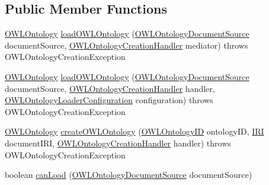\subsection*{Public Member Functions}
\begin{DoxyCompactItemize}
\item 
\hyperlink{interfaceorg_1_1semanticweb_1_1owlapi_1_1model_1_1_o_w_l_ontology}{O\-W\-L\-Ontology} \hyperlink{classuk_1_1ac_1_1manchester_1_1cs_1_1owl_1_1owlapi_1_1_empty_in_mem_o_w_l_ontology_factory_af634a79b6d9d3f0272448329b72fd5ac}{load\-O\-W\-L\-Ontology} (\hyperlink{interfaceorg_1_1semanticweb_1_1owlapi_1_1io_1_1_o_w_l_ontology_document_source}{O\-W\-L\-Ontology\-Document\-Source} document\-Source, \hyperlink{interfaceorg_1_1semanticweb_1_1owlapi_1_1model_1_1_o_w_l_ontology_factory_1_1_o_w_l_ontology_creation_handler}{O\-W\-L\-Ontology\-Creation\-Handler} mediator)  throws O\-W\-L\-Ontology\-Creation\-Exception 
\item 
\hyperlink{interfaceorg_1_1semanticweb_1_1owlapi_1_1model_1_1_o_w_l_ontology}{O\-W\-L\-Ontology} \hyperlink{classuk_1_1ac_1_1manchester_1_1cs_1_1owl_1_1owlapi_1_1_empty_in_mem_o_w_l_ontology_factory_ab42ce956d4ecf2451d2204501c53405c}{load\-O\-W\-L\-Ontology} (\hyperlink{interfaceorg_1_1semanticweb_1_1owlapi_1_1io_1_1_o_w_l_ontology_document_source}{O\-W\-L\-Ontology\-Document\-Source} document\-Source, \hyperlink{interfaceorg_1_1semanticweb_1_1owlapi_1_1model_1_1_o_w_l_ontology_factory_1_1_o_w_l_ontology_creation_handler}{O\-W\-L\-Ontology\-Creation\-Handler} handler, \hyperlink{classorg_1_1semanticweb_1_1owlapi_1_1model_1_1_o_w_l_ontology_loader_configuration}{O\-W\-L\-Ontology\-Loader\-Configuration} configuration)  throws O\-W\-L\-Ontology\-Creation\-Exception 
\item 
\hyperlink{interfaceorg_1_1semanticweb_1_1owlapi_1_1model_1_1_o_w_l_ontology}{O\-W\-L\-Ontology} \hyperlink{classuk_1_1ac_1_1manchester_1_1cs_1_1owl_1_1owlapi_1_1_empty_in_mem_o_w_l_ontology_factory_a1003eaa117b31629df5d21089c2c38e7}{create\-O\-W\-L\-Ontology} (\hyperlink{classorg_1_1semanticweb_1_1owlapi_1_1model_1_1_o_w_l_ontology_i_d}{O\-W\-L\-Ontology\-I\-D} ontology\-I\-D, \hyperlink{classorg_1_1semanticweb_1_1owlapi_1_1model_1_1_i_r_i}{I\-R\-I} document\-I\-R\-I, \hyperlink{interfaceorg_1_1semanticweb_1_1owlapi_1_1model_1_1_o_w_l_ontology_factory_1_1_o_w_l_ontology_creation_handler}{O\-W\-L\-Ontology\-Creation\-Handler} handler)  throws O\-W\-L\-Ontology\-Creation\-Exception 
\item 
boolean \hyperlink{classuk_1_1ac_1_1manchester_1_1cs_1_1owl_1_1owlapi_1_1_empty_in_mem_o_w_l_ontology_factory_a7e9dbf03eb5bf819e90ca8adab1dfa91}{can\-Load} (\hyperlink{interfaceorg_1_1semanticweb_1_1owlapi_1_1io_1_1_o_w_l_ontology_document_source}{O\-W\-L\-Ontology\-Document\-Source} document\-Source)
\end{DoxyCompactItemize}
